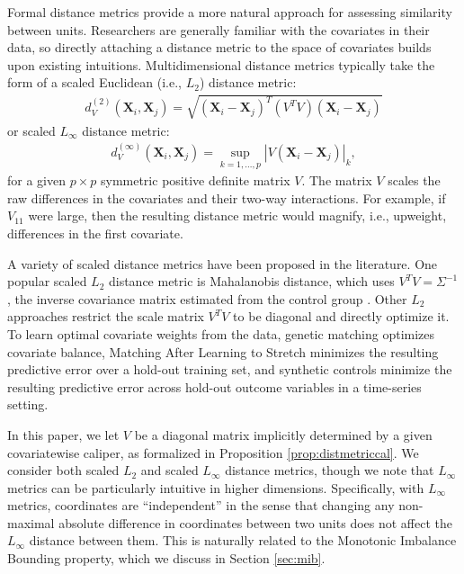 \documentclass{article}
\newcommand{\bX}{\mathbf{X}}
\begin{document}
Formal distance metrics provide a more natural approach for assessing similarity between units.
Researchers are generally familiar with the covariates in their data, 
so directly attaching a distance metric to the space of covariates builds upon existing intuitions.
Multidimensional distance metrics typically take the form of a scaled Euclidean (i.e., $L_2$) distance metric:
\begin{align}
\label{eq:l2dist}
    d^{(2)}_V(\bX_i, \bX_j) = \sqrt{(\bX_i - \bX_j)^T (V^T V) (\bX_i - \bX_j)}
\end{align}
or scaled $L_\infty$ distance metric:
\begin{align}
\label{eq:linfdist}
    d^{(\infty)}_V(\bX_i, \bX_j) 
    = \sup_{k = 1, \dots, p} |V (\bX_i - \bX_j)|_k,
\end{align}
for a given $p \times p$ symmetric positive definite matrix $V$.
The matrix $V$ scales the raw differences in the covariates and their two-way interactions.
For example, if $V_{11}$ were large, then the resulting distance metric would magnify, i.e., upweight, differences in the first covariate.

A variety of scaled distance metrics have been proposed in the literature.
One popular scaled $L_2$ distance metric is Mahalanobis distance, which uses $V^T V = \Sigma^{-1}$, the inverse covariance matrix estimated from the control group \citep{rubin1980bias}.
Other $L_2$ approaches restrict the scale matrix $V^T V$ to be diagonal and directly optimize it.
To learn optimal covariate weights from the data, genetic matching \citep{diamond2013genetic} optimizes covariate balance, Matching After Learning to Stretch \citep{parikh2022malts} minimizes the resulting predictive error over a hold-out training set, and synthetic controls \citep{abadie2010synthetic} minimize the resulting predictive error across hold-out outcome variables in a time-series setting.

In this paper, we let $V$ be a diagonal matrix implicitly determined by a given covariatewise caliper, as formalized in Proposition \ref{prop:distmetriccal}.
We consider both scaled $L_2$ and scaled $L_\infty$ distance metrics, 
though we note that $L_\infty$ metrics can be particularly intuitive in higher dimensions.
Specifically, with $L_\infty$ metrics, coordinates are ``independent'' in the sense that changing any non-maximal absolute difference in coordinates between two units does not affect the $L_\infty$ distance between them.
This is naturally related to the Monotonic Imbalance Bounding \citep[MIB; ][]{iacus2011multivariate} property, which we discuss in Section \ref{sec:mib}.
\end{document}
